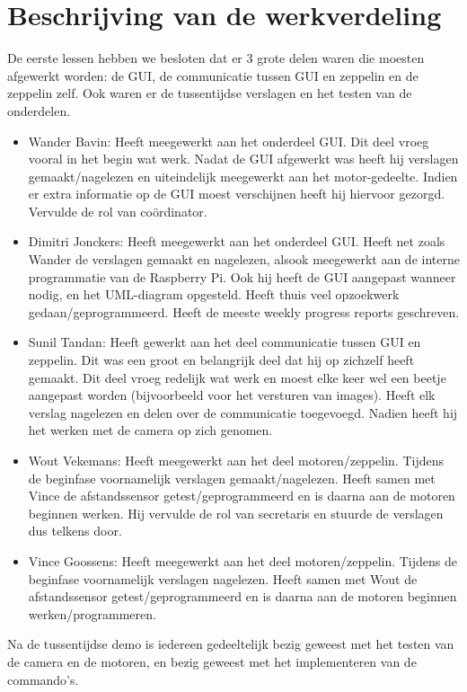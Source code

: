 \documentclass[eind]{penoverslag}
\begin{document}
\section{Beschrijving van de werkverdeling}
De eerste lessen hebben we besloten dat er 3 grote delen waren die moesten afgewerkt worden: de GUI, de communicatie tussen GUI en zeppelin en de zeppelin zelf. Ook waren er de tussentijdse verslagen en het testen van de onderdelen. \\
\begin{itemize}
\item Wander Bavin: Heeft meegewerkt aan het onderdeel GUI. Dit deel vroeg vooral in het begin wat werk. Nadat de GUI afgewerkt was heeft hij verslagen gemaakt/nagelezen en uiteindelijk meegewerkt aan het motor-gedeelte. Indien er extra informatie op de GUI moest verschijnen heeft hij hiervoor gezorgd. Vervulde de rol van co\"ordinator.
\item Dimitri Jonckers: Heeft meegewerkt aan het onderdeel GUI. Heeft net zoals Wander de verslagen gemaakt en nagelezen, alsook meegewerkt aan de interne programmatie van de Raspberry Pi. Ook hij heeft de GUI aangepast wanneer nodig, en het UML-diagram opgesteld. Heeft thuis veel opzoekwerk gedaan/geprogrammeerd. Heeft de meeste weekly progress reports geschreven.
\item Sunil Tandan: Heeft gewerkt aan het deel communicatie tussen GUI en zeppelin. Dit was een groot en belangrijk deel dat hij op zichzelf heeft gemaakt. Dit deel vroeg redelijk wat werk en moest elke keer wel een beetje aangepast worden (bijvoorbeeld voor het versturen van images). Heeft elk verslag nagelezen en delen over de communicatie toegevoegd. Nadien heeft hij het werken met de camera op zich genomen.
\item Wout Vekemans: Heeft meegewerkt aan het deel motoren/zeppelin. Tijdens de beginfase voornamelijk verslagen gemaakt/nagelezen. Heeft samen met Vince de afstandssensor getest/geprogrammeerd en is daarna aan de motoren beginnen werken. Hij vervulde de rol van secretaris en stuurde de verslagen dus telkens door.
\item Vince Goossens: Heeft meegewerkt aan het deel motoren/zeppelin. Tijdens de beginfase voornamelijk verslagen nagelezen. Heeft samen met Wout de afstandssensor getest/geprogrammeerd en is daarna aan de motoren beginnen werken/programmeren.
\end{itemize}

Na de tussentijdse demo is iedereen gedeeltelijk bezig geweest met het testen van de camera en de motoren, en bezig geweest met het implementeren van de commando's. \\
\end{document}
